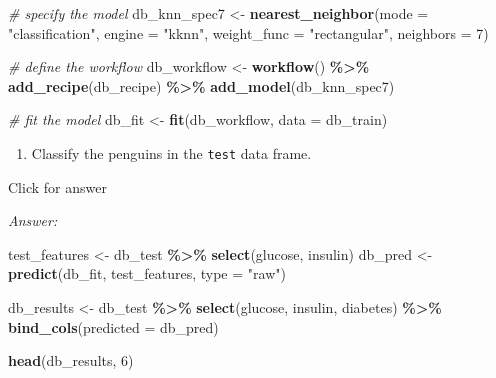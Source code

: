 \documentclass[
]{book}
\newenvironment{Shaded}{\begin{snugshade}}{\end{snugshade}}
\newcommand{\AttributeTok}[1]{\textcolor[rgb]{0.13,0.29,0.53}{#1}}
\newcommand{\CommentTok}[1]{\textcolor[rgb]{0.56,0.35,0.01}{\textit{#1}}}
\newcommand{\DecValTok}[1]{\textcolor[rgb]{0.00,0.00,0.81}{#1}}
\newcommand{\FunctionTok}[1]{\textcolor[rgb]{0.13,0.29,0.53}{\textbf{#1}}}
\newcommand{\NormalTok}[1]{#1}
\newcommand{\OtherTok}[1]{\textcolor[rgb]{0.56,0.35,0.01}{#1}}
\newcommand{\SpecialCharTok}[1]{\textcolor[rgb]{0.81,0.36,0.00}{\textbf{#1}}}
\newcommand{\StringTok}[1]{\textcolor[rgb]{0.31,0.60,0.02}{#1}}
\providecommand{\tightlist}{%
  \setlength{\itemsep}{0pt}\setlength{\parskip}{0pt}}
\begin{document}
\begin{Shaded}
\begin{Highlighting}[]
\CommentTok{\# specify the model}
\NormalTok{db\_knn\_spec7 }\OtherTok{\textless{}{-}} \FunctionTok{nearest\_neighbor}\NormalTok{(}\AttributeTok{mode =} \StringTok{"classification"}\NormalTok{,}
                             \AttributeTok{engine =} \StringTok{"kknn"}\NormalTok{,}
                             \AttributeTok{weight\_func =} \StringTok{"rectangular"}\NormalTok{,}
                             \AttributeTok{neighbors =} \DecValTok{7}\NormalTok{)}
\end{Highlighting}
\end{Shaded}

\begin{Shaded}
\begin{Highlighting}[]
\CommentTok{\# define the workflow}
\NormalTok{db\_workflow }\OtherTok{\textless{}{-}} \FunctionTok{workflow}\NormalTok{() }\SpecialCharTok{\%\textgreater{}\%} 
  \FunctionTok{add\_recipe}\NormalTok{(db\_recipe) }\SpecialCharTok{\%\textgreater{}\%}
  \FunctionTok{add\_model}\NormalTok{(db\_knn\_spec7)}
\end{Highlighting}
\end{Shaded}

\begin{Shaded}
\begin{Highlighting}[]
\CommentTok{\# fit the model}
\NormalTok{db\_fit }\OtherTok{\textless{}{-}} \FunctionTok{fit}\NormalTok{(db\_workflow, }\AttributeTok{data =}\NormalTok{ db\_train)}
\end{Highlighting}
\end{Shaded}

\begin{enumerate}
\def\labelenumi{\alph{enumi}.}
\setcounter{enumi}{2}
\tightlist
\item
  Classify the penguins in the \texttt{test} data frame.
\end{enumerate}

Click for answer

\emph{Answer:}

\begin{Shaded}
\begin{Highlighting}[]
\NormalTok{test\_features }\OtherTok{\textless{}{-}}\NormalTok{ db\_test }\SpecialCharTok{\%\textgreater{}\%} \FunctionTok{select}\NormalTok{(glucose, insulin) }
\NormalTok{db\_pred }\OtherTok{\textless{}{-}} \FunctionTok{predict}\NormalTok{(db\_fit, test\_features, }\AttributeTok{type =} \StringTok{"raw"}\NormalTok{)}

\NormalTok{db\_results }\OtherTok{\textless{}{-}}\NormalTok{ db\_test }\SpecialCharTok{\%\textgreater{}\%} 
  \FunctionTok{select}\NormalTok{(glucose, insulin, diabetes) }\SpecialCharTok{\%\textgreater{}\%} 
  \FunctionTok{bind\_cols}\NormalTok{(}\AttributeTok{predicted =}\NormalTok{ db\_pred)}

\FunctionTok{head}\NormalTok{(db\_results, }\DecValTok{6}\NormalTok{)}
\end{Highlighting}
\end{Shaded}
\end{document}
